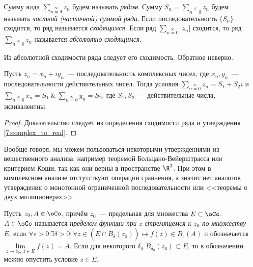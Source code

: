 \begin{definition}
Сумму вида \(\sum\limits_{n=0}\limits^{\infty} z_n\) будем называть \textit{рядом}. Сумму \(S_n =
\sum\limits_{n=0}\limits^{k} z_n\) будем называть \textit{частной (частичной) суммой ряда}. Если
последовательность \(\{S_n\}\) сходится, то ряд называется \textit{сходящимся}. Если ряд
\(\sum\limits_{n=0}\limits^{\infty} |z_n|\) сходится, то ряд \(\sum\limits_{n=0}\limits^{\infty}
z_n\) называется \textit{абсолютно сходящимся}.
\end{definition}

\begin{note}
Из абсолютной сходимости ряда следует его сходимость. Обратное неверно.
\end{note}

\begin{statement}
Пусть \(z_n = x_n + iy_n\)~--- последовательность комплексных чисел, где \(x_n, y_n\)~---
последовательности действительных чисел. Тогда условия \(\sum\limits_{n=0}\limits^{\infty} z_n = S_1
+ S_2i\) и \(\sum\limits_{n=0}\limits^{\infty} x_n = S_1 \ \& \ \sum\limits_{n=0}\limits^{\infty}
y_n = S_2\), где \(S_1, S_2\)~--- действительные числа, эквивалентны.
\end{statement}

\begin{proof}
Доказательство следует из определения сходимости ряда и утверждения \ref{7:complex_to_real}.
\end{proof}

Вообще говоря, мы можем пользоваться некоторыми утверждениями из вещественного анализа, например
теоремой Больцано-Вейерштрасса или критерием Коши, так как они верны в пространстве \(\R^2\). При
этом в комплексном анализе отстутствуют операции сравнения, а значит нет аналогов утверждения о
монотонной ограниченной последовательности или <<теоремы о двух милиционерах>>.



\begin{definition}
Пусть \(z_0, A \in \oCo\), причём \(z_0\)~--- предельная для множества \(E \subset \oCo\). \(A \in
\oCo\) называется \textit{пределом функции при \(z\) стремящемся к \(z_0\) по множеству \(E\)}, если
\(\forall \epsilon > 0 \ \exists \delta > 0 \colon \forall z \in (E \cap \mathring{B}_\delta (z_0))
\mapsto f(z) \in B_\epsilon(A)\) и обозначается \(\lim\limits_{z \to z_0, \ z \in E} f(z) = A\).
Если для некоторого \(\delta_0\) \(\mathring{B}_{\delta_0} (z_0) \subset E\), то в обозначении можно
опустить условие \(z \in E\).
\end{definition}

